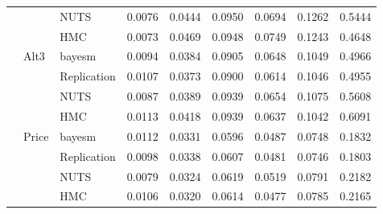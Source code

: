 \begin{tabular}{lllcccccc}
 &  & NUTS & 0.0076 & 0.0444 & 0.0950 & 0.0694 & 0.1262 & 0.5444 \\
 &  & HMC & 0.0073 & 0.0469 & 0.0948 & 0.0749 & 0.1243 & 0.4648 \\
 & Alt3 & bayesm & 0.0094 & 0.0384 & 0.0905 & 0.0648 & 0.1049 & 0.4966 \\
 &  & Replication & 0.0107 & 0.0373 & 0.0900 & 0.0614 & 0.1046 & 0.4955 \\
 &  & NUTS & 0.0087 & 0.0389 & 0.0939 & 0.0654 & 0.1075 & 0.5608 \\
 &  & HMC & 0.0113 & 0.0418 & 0.0939 & 0.0637 & 0.1042 & 0.6091 \\
 & Price & bayesm & 0.0112 & 0.0331 & 0.0596 & 0.0487 & 0.0748 & 0.1832 \\
 &  & Replication & 0.0098 & 0.0338 & 0.0607 & 0.0481 & 0.0746 & 0.1803 \\
 &  & NUTS & 0.0079 & 0.0324 & 0.0619 & 0.0519 & 0.0791 & 0.2182 \\
 &  & HMC & 0.0106 & 0.0320 & 0.0614 & 0.0477 & 0.0785 & 0.2165 \\
\bottomrule
\end{tabular}
